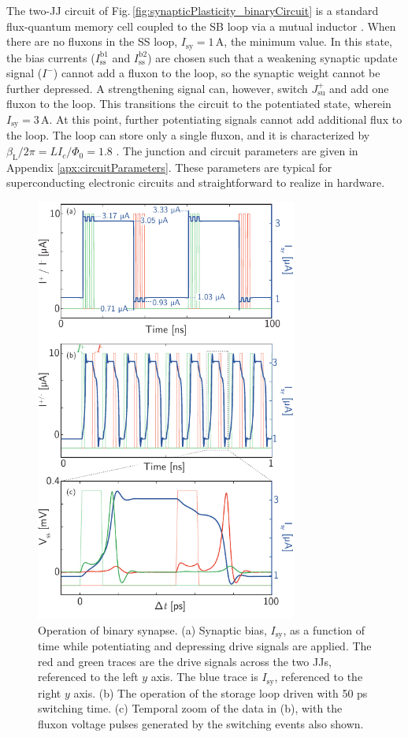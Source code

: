 \documentclass[aip,amsmath,amssymb,reprint,nofootinbib]{revtex4-1}
\begin{document}
The two-JJ circuit of Fig.\,\ref{fig:synapticPlasticity_binaryCircuit} is a standard flux-quantum memory cell \cite{ka1999,vatu1998} coupled to the SB loop via a mutual inductor \cite{miha2005}. When there are no fluxons in the SS loop, $I_{\mathrm{sy}} = 1$\,\textmu A, the minimum value. In this state, the bias currents ($I^{\mathrm{b1}}_{\mathrm{ss}}$ and $I^{\mathrm{b2}}_{\mathrm{ss}}$) are chosen such that a weakening synaptic update signal ($I^-$) cannot add a fluxon to the loop, so the synaptic weight cannot be further depressed. A strengthening signal can, however, switch $J_{\mathrm{su}}^+$ and add one fluxon to the loop. This transitions the circuit to the potentiated state, wherein $I_{\mathrm{sy}} = 3$\,\textmu A. At this point, further potentiating signals cannot add additional flux to the loop. The loop can store only a single fluxon, and it is characterized by $\beta_{\mathrm{L}}/2\pi = L I_c/\Phi_0 = 1.8$ \cite{ka1999,vatu1998}. The junction and circuit parameters are given in Appendix \ref{apx:circuitParameters}. These parameters are typical for superconducting electronic circuits and straightforward to realize in hardware.
\begin{figure}[t!]
	\centerline{\includegraphics[width=8.6cm]{_synapticPlasticity_binary_small.pdf}}
	\caption{\label{fig:synapticPlasticity_binary}Operation of binary synapse. (a) Synaptic bias, $I_{\mathrm{sy}}$, as a function of time while potentiating and depressing drive signals are applied. The red and green traces are the drive signals across the two JJs, referenced to the left $y$ axis. The blue trace is $I_{\mathrm{sy}}$, referenced to the right $y$ axis. (b) The operation of the storage loop driven with 50 ps switching time. (c) Temporal zoom of the data in (b), with the fluxon voltage pulses generated by the switching events also shown.}
\end{figure}
\end{document}
